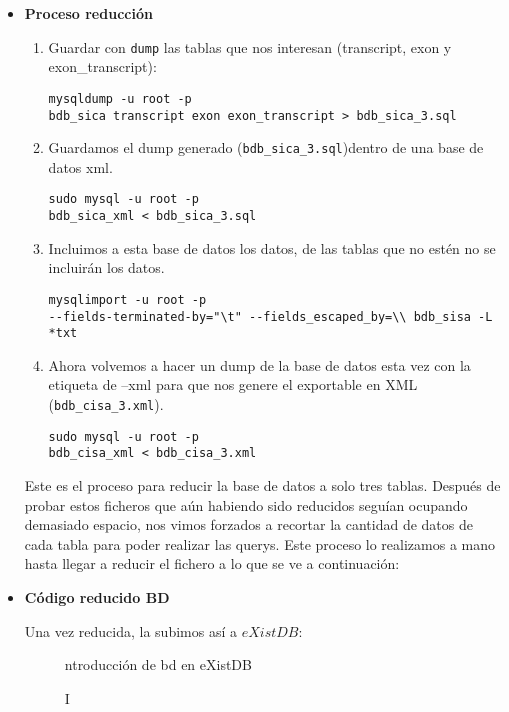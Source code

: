 \documentclass[12pt,a4paper]{article}
\begin{document}
\begin{itemize}

\item \textbf{Proceso reducción}

\begin{enumerate}

\item Guardar con \verb|dump| las tablas que nos interesan (transcript, exon y exon\_transcript):

\begin{verbatim}
mysqldump -u root -p 
bdb_sica transcript exon exon_transcript > bdb_sica_3.sql
\end{verbatim}


\item Guardamos el dump generado (\verb|bdb_sica_3.sql|)dentro de una base de datos xml.
\begin{verbatim}
sudo mysql -u root -p 
bdb_sica_xml < bdb_sica_3.sql
\end{verbatim}

\item Incluimos a esta base de datos los datos, de las tablas que no estén no se incluirán los datos.
\begin{verbatim}
mysqlimport -u root -p 
--fields-terminated-by="\t" --fields_escaped_by=\\ bdb_sisa -L *txt
\end{verbatim}


\item Ahora volvemos a hacer un dump de la base de datos esta vez con la etiqueta de --xml para que nos genere el exportable en XML (\verb|bdb_cisa_3.xml|).

\begin{verbatim}
sudo mysql -u root -p 
bdb_cisa_xml < bdb_cisa_3.xml
\end{verbatim}
\end{enumerate}

Este es el proceso para reducir la base de datos a solo tres tablas. Después de probar estos ficheros que aún habiendo sido reducidos seguían ocupando demasiado espacio, nos vimos forzados a recortar la cantidad de datos de cada tabla para poder realizar las querys. Este proceso lo realizamos a mano hasta llegar a reducir el fichero a lo que se ve a continuación:


\item \textbf{Código reducido BD}



Una vez reducida, la subimos así a $eXistDB$:

\begin{figure}[!h]
\centering
{}
\caption Introducción de bd en eXistDB
\label{exit1}
\end{figure}

\end{itemize}
\end{document}
